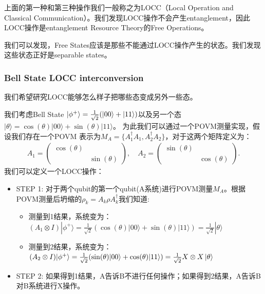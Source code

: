 \bigskip
{}

上面的第一种和第三种操作我们一般称之为LOCC（Local Operation and Classical
Communication）。我们发现LOCC操作不会产生entanglement，因此LOCC操作是entanglement
Resource Theory的Free Operations。

\bigskip
{}

我们可以发现，Free States应该是那些不能通过LOCC操作产生的状态。我们发现这些状态正好是separable states。

\subsubsection{Bell State LOCC interconversion}

我们希望研究LOCC能够怎么样子把哪些态变成另外一些态。

\bigskip
{}

我们考虑Bell State $ \left| \phi^+ \right\rangle = \frac{1}{\sqrt{2}} (\left| 00 \right\rangle +
\left| 11 \right\rangle) $以及另一个态$
|\theta\rangle=\cos(\theta)|00\rangle+\sin(\theta)|11\rangle $。
为此我们可以通过一个POVM测量实现，假设我们存在一个POVM 表示为$ M_A = \{A_1^\dagger A_1,
A_2^\dagger A_2 \} $，对于这两个矩阵定义为：
\begin{align}
  A_1=
  \begin{pmatrix}\cos(\theta)&\\&\sin(\theta)
  \end{pmatrix},\quad A_2=
  \begin{pmatrix}\sin(\theta)&\\&\cos(\theta)
  \end{pmatrix}.
\end{align}
我们可以定义一个LOCC操作：
\begin{itemize}
  \item STEP 1: 对于两个qubit的第一个qubit(A系统)进行POVM测量$ M_A $。根据POVM测量后坍缩的$
    \rho_k = A_k \rho A_k^\dagger $我们知道:
    \begin{itemize}
      \item 测量到1结果，系统变为：$ (A_1\otimes
        I)|\phi^+\rangle=\frac{1}{\sqrt{2}}(\cos(\theta)|00\rangle+\sin(\theta)|11\rangle)=\frac{1}{\sqrt{2}}|\theta\rangle
        $
      \item 测量到2结果，系统变为：$ (A_2\otimes
        I)|\phi^+\rangle=\frac{1}{\sqrt{2}}(\sin(\theta)|00\rangle+\cos(\theta)|11\rangle)
        = \frac{1}{\sqrt{2}} X \otimes X \left| \theta \right\rangle $
    \end{itemize}
  \item STEP 2: 如果得到1结果，A告诉B不进行任何操作；如果得到2结果，A告诉B对B系统进行X操作。
\end{itemize}

